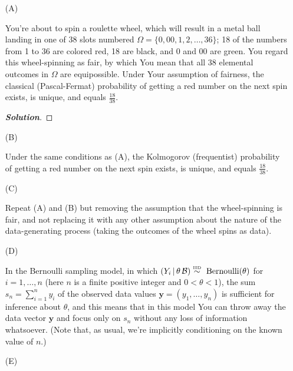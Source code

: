 \documentclass[12pt]{article}
\newcommand{\given}{\, | \,}
\newenvironment{solution}{\begin{proof}[\textbf{\textit{Solution}}] }{\end{proof}}
\newcommand{\given}{\, | \,}
\begin{document}
\begin{itemize}
\item[(A)]

You're about to spin a roulette wheel, which will result in a metal ball
landing in one of 38 slots numbered $\Omega = \{ 0, 00, 1, 2, \dots, 36
\}$; 18 of the numbers from 1 to 36 are colored red, 18 are black, and 0
and 00 are green. You regard this wheel-spinning as fair, by which You mean
that all 38 elemental outcomes in $\Omega$ are equipossible. Under Your
assumption of fairness, the classical (Pascal-Fermat) probability of
getting a red number on the next spin exists, is unique, and equals $\frac{
18 }{ 38 }$.
\begin{solution}
    
\end{solution}

\item[(B)]

Under the same conditions as (A), the Kolmogorov (frequentist) probability
of getting a red number on the next spin exists, is unique, and equals
$\frac{ 18 }{ 38 }$.

\item[(C)]

Repeat (A) and (B) but removing the assumption that the wheel-spinning is fair, and not replacing it with any other assumption about the nature of the data-generating process (taking the outcomes of the wheel spins as data).

\item[(D)]

In the Bernoulli sampling model, in which $( Y_i \given \theta \, \mathcal B ) \stackrel{ \textrm{\tiny IID} }{ \sim } \textrm{ Bernoulli} ( \theta )$ for $i = 1, \dots, n$ (here $n$ is a finite positive integer and $0 < \theta < 1$), the sum $s_n = \sum_{ i = 1 }^n y_i$ of the observed data values $\bm{ y } = ( y_1, \dots, y_n )$ is sufficient for inference about $\theta$, and this means that in this model You can throw away the data vector $\bm{ y }$ and focus only on $s_n$ without any loss of information whatsoever. (Note that, as usual, we're implicitly conditioning on the known value of $n$.)

\item[(E)]


\end{itemize}
\end{document}
